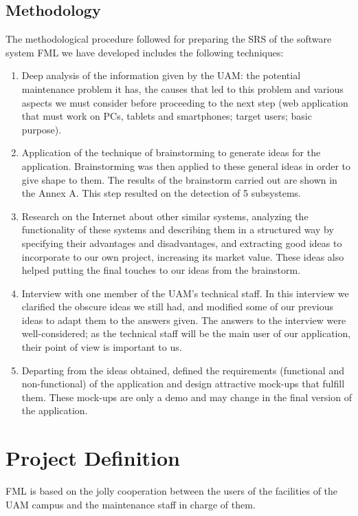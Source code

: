 \documentclass{report}
\begin{document}
\section{Methodology}

The methodological procedure followed for preparing the SRS of the software system FML we have developed includes the following techniques:
\begin{enumerate}
\item Deep analysis of the information given by the UAM: the potential maintenance problem it has, the causes that led to this problem and various aspects we must consider before proceeding to the next step (web application that must work on PCs, tablets and smartphones; target users; basic purpose).
\item Application of the technique of brainstorming to generate ideas for the application. Brainstorming was then applied to these general ideas in order to give shape to them. The results of the brainstorm carried out are shown in the Annex A. This step resulted on the detection of 5 subsystems.
\item Research on the Internet about other similar systems, analyzing the functionality of these systems and describing them in a structured way by specifying their advantages and disadvantages, and extracting good ideas to incorporate to our own project, increasing its market value. These ideas also helped putting the final touches to our ideas from the brainstorm.
\item Interview with one member of the UAM's technical staff. In this interview we clarified the obscure ideas we still had, and modified some of our previous ideas to adapt them to the answers given. The answers to the interview were well-considered; as the technical staff will be the main user of our application, their point of view is important to us.
\item Departing from the ideas obtained, defined the requirements (functional and non-functional) of the application and design attractive mock-ups that fulfill them. These mock-ups are only a demo and may change in the final version of the application.
\end{enumerate}

\chapter{Project Definition}

FML is based on the jolly cooperation between the users of the facilities of the UAM campus and the maintenance staff in charge of them.
\end{document}
